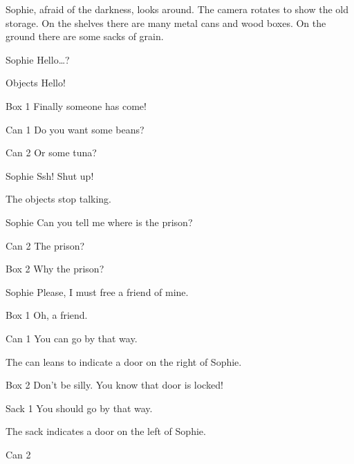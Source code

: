\begin{screenplay}

Sophie, afraid of the darkness, looks around. The camera rotates to show the old storage. On the shelves there are many metal cans and wood boxes. On the ground there are some sacks of grain.

\begin{dialogue}{Sophie}
Hello…?
\end{dialogue}
\begin{dialogue}[cheerful]{Objects}
 Hello!
\end{dialogue}
\begin{dialogue}{Box 1}
 Finally someone has come!
\end{dialogue}
\begin{dialogue}{Can 1}
 Do you want some beans?
\end{dialogue}
\begin{dialogue}{Can 2}
Or some tuna?
\end{dialogue}
\begin{dialogue}[worried]{Sophie}
Ssh! Shut up!
\end{dialogue}
The objects stop talking.
\begin{dialogue}{Sophie}
Can you tell me where is the prison?
\end{dialogue}
\begin{dialogue}[surprised]{Can 2}
The prison?
\end{dialogue}
\begin{dialogue}[surprised]{Box 2}
Why the prison?
\end{dialogue}
\begin{dialogue}{Sophie}
Please, I must free a friend of mine.
\end{dialogue}
\begin{dialogue}{Box 1}
Oh, a friend.
\end{dialogue}
\begin{dialogue}{Can 1}
You can go by that way.
\end{dialogue}
The can leans to indicate a door on the right of Sophie.
\begin{dialogue}{Box 2}
Don't be silly. You know that door is locked!
\end{dialogue}
\begin{dialogue}{Sack 1}
You should go by that way.
\end{dialogue}
The sack indicates a door on the left of Sophie.
\begin{dialogue}{Can 2}

\end{dialogue}
\end{screenplay}
